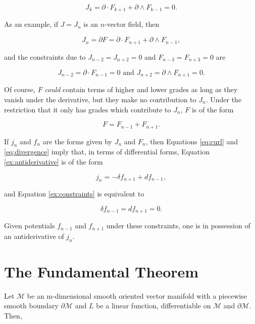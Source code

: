 \documentclass[twocolumn]{article}
\begin{document}
\begin{equation}
  J_k = \partial \cdot F_{k+1} + \partial \wedge F_{k-1} = 0.\label{eq:constraints}
\end{equation}

As an example, if $J = J_n$ is an $n$-vector field, then 

\begin{equation}
  J_n = \partial F = \partial \cdot F_{n+1} + \partial \wedge F_{n-1},\label{ex:antiderivative}
\end{equation}

and the constraints due to $J_{n-2} = J_{n+2} = 0$ and $F_{n-3} = F_{n+3} = 0$ are

\begin{equation}
  J_{n-2} = \partial \cdot F_{n-1} = 0 \text{ and } J_{n+2} = \partial \wedge F_{n+1} = 0.\label{ex:constraints}
\end{equation}

Of course, $F$ \emph{could} contain terms of higher and lower grades as long as they vanish under the derivative, but they make no contribution to $J_n$. Under the restriction that it only has grades which contribute to $J_n$, $F$ is of the form 

\begin{equation}
  F = F_{n-1} + F_{n+1}.
\end{equation}

If $j_n$ and $f_n$ are the forms given by $J_n$ and $F_n$, then Equations \ref{eq:curl} and \ref{eq:divergence} imply that, in terms of differential forms, Equation \ref{ex:antiderivative} is of the form

\begin{equation}
  j_n = -\delta f_{n+1} + d f_{n-1},
\end{equation}

and Equation \ref{ex:constraints} is equivalent to

\begin{equation}
  \delta f_{n-1} = d f_{n+1} = 0.
\end{equation}

Given potentials $f_{n-1}$ and $f_{n+1}$ under these constraints, one is in possession of an antiderivative of $j_n$.

\section{The Fundamental Theorem}

Let $\mathcal{M}$ be an m-dimensional smooth oriented vector manifold with a piecewise smooth boundary $\partial \mathcal{M}$ and $L$ be a linear function, differentiable on $\mathcal{M}$ and $\partial \mathcal{M}$. Then, \cite{cagc} \cite{sobczyk} \cite{gap}
\end{document}
